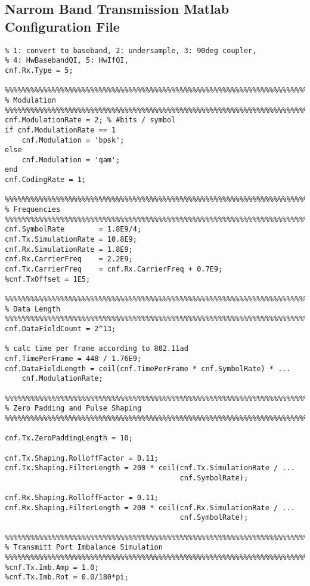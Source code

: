 \begin{appendix}
\chapter{Narrom Band Transmission Matlab Configuration File}
\label{app:res_450_cnf}
\begin{verbatim}
% 1: convert to baseband, 2: undersample, 3: 90deg coupler,
% 4: HwBasebandQI, 5: HwIfQI,
cnf.Rx.Type = 5;

%%%%%%%%%%%%%%%%%%%%%%%%%%%%%%%%%%%%%%%%%%%%%%%%%%%%%%%%%%%%%%%%%%%%%%%%%%%%%%%%
% Modulation
%%%%%%%%%%%%%%%%%%%%%%%%%%%%%%%%%%%%%%%%%%%%%%%%%%%%%%%%%%%%%%%%%%%%%%%%%%%%%%%%
cnf.ModulationRate = 2; % #bits / symbol
if cnf.ModulationRate == 1
    cnf.Modulation = 'bpsk';
else
    cnf.Modulation = 'qam';
end
cnf.CodingRate = 1;

%%%%%%%%%%%%%%%%%%%%%%%%%%%%%%%%%%%%%%%%%%%%%%%%%%%%%%%%%%%%%%%%%%%%%%%%%%%%%%%%
% Frequencies
%%%%%%%%%%%%%%%%%%%%%%%%%%%%%%%%%%%%%%%%%%%%%%%%%%%%%%%%%%%%%%%%%%%%%%%%%%%%%%%%
cnf.SymbolRate        = 1.8E9/4;
cnf.Tx.SimulationRate = 10.8E9;
cnf.Rx.SimulationRate = 1.8E9;
cnf.Rx.CarrierFreq    = 2.2E9;
cnf.Tx.CarrierFreq    = cnf.Rx.CarrierFreq + 0.7E9;
%cnf.TxOffset = 1E5;

%%%%%%%%%%%%%%%%%%%%%%%%%%%%%%%%%%%%%%%%%%%%%%%%%%%%%%%%%%%%%%%%%%%%%%%%%%%%%%%%
% Data Length
%%%%%%%%%%%%%%%%%%%%%%%%%%%%%%%%%%%%%%%%%%%%%%%%%%%%%%%%%%%%%%%%%%%%%%%%%%%%%%%%
cnf.DataFieldCount = 2^13;

% calc time per frame according to 802.11ad
cnf.TimePerFrame = 448 / 1.76E9;
cnf.DataFieldLength = ceil(cnf.TimePerFrame * cnf.SymbolRate) * ...
    cnf.ModulationRate;

%%%%%%%%%%%%%%%%%%%%%%%%%%%%%%%%%%%%%%%%%%%%%%%%%%%%%%%%%%%%%%%%%%%%%%%%%%%%%%%%
% Zero Padding and Pulse Shaping
%%%%%%%%%%%%%%%%%%%%%%%%%%%%%%%%%%%%%%%%%%%%%%%%%%%%%%%%%%%%%%%%%%%%%%%%%%%%%%%%

cnf.Tx.ZeroPaddingLength = 10;

cnf.Tx.Shaping.RolloffFactor = 0.11;
cnf.Tx.Shaping.FilterLength = 200 * ceil(cnf.Tx.SimulationRate / ...
                                         cnf.SymbolRate);

cnf.Rx.Shaping.RolloffFactor = 0.11;
cnf.Rx.Shaping.FilterLength = 200 * ceil(cnf.Rx.SimulationRate / ...
                                         cnf.SymbolRate);

%%%%%%%%%%%%%%%%%%%%%%%%%%%%%%%%%%%%%%%%%%%%%%%%%%%%%%%%%%%%%%%%%%%%%%%%%%%%%%%%
% Transmitt Port Imbalance Simulation
%%%%%%%%%%%%%%%%%%%%%%%%%%%%%%%%%%%%%%%%%%%%%%%%%%%%%%%%%%%%%%%%%%%%%%%%%%%%%%%%
%cnf.Tx.Imb.Amp = 1.0;
%cnf.Tx.Imb.Rot = 0.0/180*pi;


\end{verbatim}
\end{appendix}
